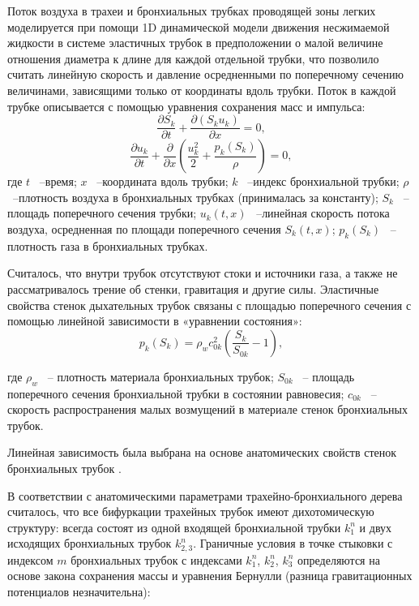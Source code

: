 Поток воздуха в трахеи и бронхиальных трубках проводящей зоны легких моделируется при помощи 1D динамической модели движения несжимаемой жидкости в системе эластичных трубок в предположении о малой величине отношения диаметра к длине для каждой отдельной трубки, что позволило считать линейную скорость и давление осредненными по поперечному сечению величинами, зависящими только от координаты вдоль трубки. Поток в каждой трубке описывается с помощью уравнения сохранения масс и импульса\cite{Simakov08b,Kholodov2006}:
\begin{equation} \label{GrindEQ__1_} 
\frac{\partial S_{k} }{\partial t} +\frac{\partial \left(S_{k} u_{k} \right)}{\partial x} =0,  
\end{equation} 
\begin{equation} \label{GrindEQ__2_} 
\frac{\partial u_{k} }{\partial t} +\frac{\partial }{\partial x} \left(\frac{u_{k}^{2} }{2} +\frac{p_{k} \left(S_{k} \right)}{\rho } \right)=0,  
\end{equation} 
где $t$ ~--время; $x$ ~--координата вдоль трубки; $k$ ~--индекс бронхиальной трубки; $\rho $ ~--плотность воздуха в бронхиальных трубках (принималась за константу); $S_{k} $ ~--площадь поперечного сечения трубки; $u_{k} \left(t,x\right)$ ~--линейная скорость потока воздуха, осредненная по площади поперечного сечения $S_{k} \left(t,x\right)$; $p_{k} \left(S_{k} \right)$ ~--плотность газа в бронхиальных трубках. 

Считалось, что внутри трубок отсутствуют стоки и источники газа, а также не рассматривалось трение об стенки, гравитация и другие силы. Эластичные свойства стенок дыхательных трубок связаны с площадью поперечного сечения с помощью линейной зависимости в «уравнении состояния»: 
\begin{equation} \label{GrindEQ__3_} 
p_{k} \left(S_{k} \right)=\rho _{w} c_{0k}^{2} \left(\frac{S_{k} }{S_{0k} } -1\right),  
\end{equation} 

где $\rho _{w} $ ~-- плотность материала бронхиальных трубок; $S_{0k} $ ~-- площадь поперечного сечения бронхиальной трубки в состоянии равновесия; $c_{0k} $ ~-- скорость распространения малых возмущений в материале стенок бронхиальных трубок. 

Линейная зависимость была выбрана на основе анатомических свойств стенок бронхиальных трубок \cite{Simakov08b}.

В соответствии с анатомическими параметрами трахейно-бронхиального дерева считалось, что все бифуркации трахейных трубок имеют дихотомическую структуру: всегда состоят из одной входящей бронхиальной трубки $k_{1}^{n}  $ и двух исходящих бронхиальных трубок $k_{2,3}^{n} $. Граничные условия в точке стыковки с индексом $m$ бронхиальных трубок с индексами $k_{1}^{n} $, $k_{2}^{n} $, $k_{3}^{n} $ определяются на основе закона сохранения массы и уравнения Бернулли (разница гравитационных потенциалов незначительна):  

